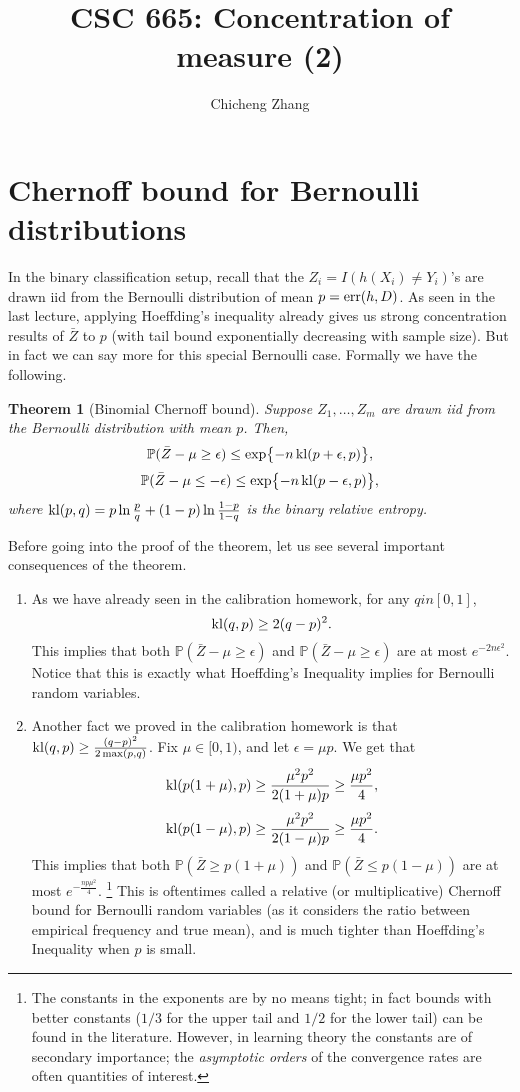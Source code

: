\documentclass{article}
\title{CSC 665: Concentration of measure (2)}
\author{Chicheng Zhang}
\newtheorem{theorem}{Theorem}
\DeclareMathOperator*{\kl}{{\rm kl}}
\DeclareMathOperator*{\err}{{\rm err}}
\newcommand{\PP}{\mathbb{P}} %
\begin{document}
\maketitle

\section{Chernoff bound for Bernoulli distributions}
In the binary classification setup, recall that the $Z_i = I(h(X_i) \neq Y_i)$'s are drawn iid from the Bernoulli distribution of mean $p = \err(h, D)$. As seen in the last lecture, applying Hoeffding's inequality
 already gives us strong concentration results of $\bar{Z}$ to $p$ (with tail bound exponentially decreasing with sample size). But in fact we can say more for this special Bernoulli case. Formally we have the following.

\begin{theorem}[Binomial Chernoff bound]
Suppose $Z_1,\ldots,Z_m$ are drawn iid from the Bernoulli distribution with mean $p$.
Then,
\[ \PP(\bar{Z} - \mu \geq \epsilon) \leq \exp{-n \kl(p+\epsilon, p)}, \]
\[ \PP(\bar{Z} - \mu \leq -\epsilon) \leq \exp{-n \kl(p-\epsilon, p)}, \]
where $\kl(p,q) = p \ln \frac p q + (1-p) \ln \frac {1-p} {1-q}$ is the binary
relative entropy.
\end{theorem}

Before going into the proof of the theorem, let us see several important consequences
of the theorem.
\begin{enumerate}
  \item As we have already seen in the calibration homework, for any $q in [0,1]$,
  \[ \kl(q, p) \geq 2(q-p)^2. \]
  This implies that both $\PP(\bar{Z} - \mu \geq \epsilon)$ and $\PP(\bar{Z} - \mu \geq \epsilon)$ are at most $e^{-2n\epsilon^2}$. Notice that this is exactly what Hoeffding's Inequality implies for Bernoulli random variables.

  \item Another fact we proved in the calibration homework is that $\kl(q, p) \geq \frac{(q-p)^2}{2 \max(p,q)}$.
  Fix $\mu \in [0,1)$, and let $\epsilon = \mu p$. We get that
  \[ \kl(p(1+\mu), p) \geq \frac{\mu^2 p^2}{2(1+\mu) p} \geq \frac{\mu p^2}{4}, \]
  \[ \kl(p(1-\mu), p) \geq \frac{\mu^2 p^2}{2(1-\mu) p} \geq \frac{\mu p^2}{4}.  \]
  This implies that both
  $\PP(\bar{Z} \geq p(1+\mu) )$ and $\PP(\bar{Z} \leq p(1-\mu))$ are at most $e^{-\frac{n p \mu^2}{4}}$. \footnote{The constants in the exponents are by no means tight; in fact bounds with better constants ($1/3$ for the upper tail and $1/2$ for the lower tail) can be found in the literature. However, in learning theory the constants are of secondary importance; the {\em asymptotic orders} of the convergence rates are often quantities of interest.} This is oftentimes called a relative (or multiplicative) Chernoff bound for
  Bernoulli random variables (as it considers the ratio between empirical frequency and true mean), and is much tighter than Hoeffding's Inequality
  when $p$ is small.
\end{enumerate}
\end{document}
